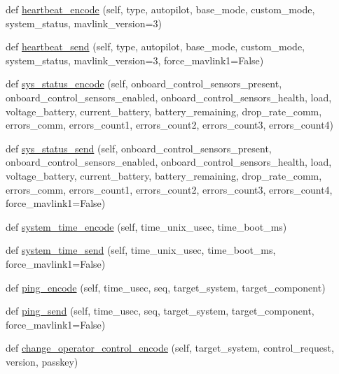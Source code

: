 \begin{DoxyCompactItemize}
def \hyperlink{classpymavlink_1_1dialects_1_1v10_1_1MAVLink_a021a8636c75c709fdddb5af02d44456d}{heartbeat\+\_\+encode} (self, type, autopilot, base\+\_\+mode, custom\+\_\+mode, system\+\_\+status, mavlink\+\_\+version=3)
\item 
def \hyperlink{classpymavlink_1_1dialects_1_1v10_1_1MAVLink_a1ca242912a8bd37b0646d5866351bac5}{heartbeat\+\_\+send} (self, type, autopilot, base\+\_\+mode, custom\+\_\+mode, system\+\_\+status, mavlink\+\_\+version=3, force\+\_\+mavlink1=False)
\item 
def \hyperlink{classpymavlink_1_1dialects_1_1v10_1_1MAVLink_a1aecda2c67df087fe13c248b46ac4f6f}{sys\+\_\+status\+\_\+encode} (self, onboard\+\_\+control\+\_\+sensors\+\_\+present, onboard\+\_\+control\+\_\+sensors\+\_\+enabled, onboard\+\_\+control\+\_\+sensors\+\_\+health, load, voltage\+\_\+battery, current\+\_\+battery, battery\+\_\+remaining, drop\+\_\+rate\+\_\+comm, errors\+\_\+comm, errors\+\_\+count1, errors\+\_\+count2, errors\+\_\+count3, errors\+\_\+count4)
\item 
def \hyperlink{classpymavlink_1_1dialects_1_1v10_1_1MAVLink_a42d1d894ef57669fb8790d2500068209}{sys\+\_\+status\+\_\+send} (self, onboard\+\_\+control\+\_\+sensors\+\_\+present, onboard\+\_\+control\+\_\+sensors\+\_\+enabled, onboard\+\_\+control\+\_\+sensors\+\_\+health, load, voltage\+\_\+battery, current\+\_\+battery, battery\+\_\+remaining, drop\+\_\+rate\+\_\+comm, errors\+\_\+comm, errors\+\_\+count1, errors\+\_\+count2, errors\+\_\+count3, errors\+\_\+count4, force\+\_\+mavlink1=False)
\item 
def \hyperlink{classpymavlink_1_1dialects_1_1v10_1_1MAVLink_a4965930dad55c57d7bc1a508345de3a5}{system\+\_\+time\+\_\+encode} (self, time\+\_\+unix\+\_\+usec, time\+\_\+boot\+\_\+ms)
\item 
def \hyperlink{classpymavlink_1_1dialects_1_1v10_1_1MAVLink_aef88d7426f36636546135540acf5daae}{system\+\_\+time\+\_\+send} (self, time\+\_\+unix\+\_\+usec, time\+\_\+boot\+\_\+ms, force\+\_\+mavlink1=False)
\item 
def \hyperlink{classpymavlink_1_1dialects_1_1v10_1_1MAVLink_ab77983a69b2d289e2c93cc7d6919807c}{ping\+\_\+encode} (self, time\+\_\+usec, seq, target\+\_\+system, target\+\_\+component)
\item 
def \hyperlink{classpymavlink_1_1dialects_1_1v10_1_1MAVLink_a3dd7de5027f96e9b0d09837a97c76a5a}{ping\+\_\+send} (self, time\+\_\+usec, seq, target\+\_\+system, target\+\_\+component, force\+\_\+mavlink1=False)
\item 
def \hyperlink{classpymavlink_1_1dialects_1_1v10_1_1MAVLink_aec5eaad4becad783155f53366bc0ba8c}{change\+\_\+operator\+\_\+control\+\_\+encode} (self, target\+\_\+system, control\+\_\+request, version, passkey)

\end{DoxyCompactItemize}
